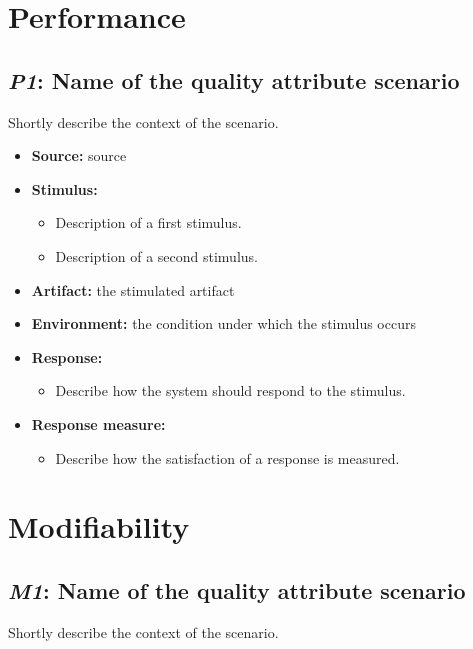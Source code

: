 \documentclass[english,peerreview]{sareport}
\begin{document}
\section{Performance}
\subsection{\emph{P1}: Name of the quality attribute scenario}
Shortly describe the context of the scenario.

\begin{itemize}
    \item \textbf{Source:} source
    \item \textbf{Stimulus:}
        \begin{itemize}
            \item Description of a first stimulus.
            \item Description of a second stimulus.
        \end{itemize}

    \item \textbf{Artifact:} the stimulated artifact
    \item \textbf{Environment:} the condition under which the stimulus occurs
    \item \textbf{Response:}
        \begin{itemize}
            \item Describe how the system should respond to the stimulus.
        \end{itemize}

    \item \textbf{Response measure:}
        \begin{itemize}
            \item Describe how the satisfaction of a response is measured.
        \end{itemize}
\end{itemize}

\section{Modifiability}
\subsection{\emph{M1}: Name of the quality attribute scenario}
Shortly describe the context of the scenario.
\end{document}
